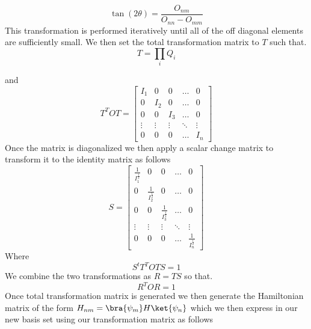   \begin{equation}
      \tan(2\theta)=\frac{O_{nm}}{O_{nn}-O_{mm}}
  \end{equation}
  This transformation is performed iteratively until all of the off diagonal elements are sufficiently small. We then set the total transformation matrix to \(T\) such that.
  \begin{equation}
      T=\prod_{i} Q_{i}
  \end{equation}

and
\begin{equation}
     T^{T}OT=\begin{bmatrix}
     I_{1}       & 0      & 0      &\hdots   & 0     \\
     0           & I_{2}  & 0      &\hdots   & 0     \\
     0           & 0      & I_{3}  &\hdots   & 0     \\  
    \vdots       & \vdots &\vdots  &\ddots   &\vdots \\  
     0           & 0      & 0      &\hdots   & I_{n} 
    \end{bmatrix}
 \end{equation}
Once the matrix is diagonalized we then apply a scalar change matrix to transform it to the identity matrix as follows
\begin{equation}
    S=\begin{bmatrix}
     \frac{1}{I_{1}^{\frac{1}{2}}}       & 0      & 0      &\hdots   & 0     \\
     0            &  \frac{1}{I_{2}^{\frac{1}{2}}}  & 0      &\hdots   & 0     \\
     0            & 0      &  \frac{1}{I_{3}^{\frac{1}{2}}}  &\hdots   & 0     \\  
     \vdots       & \vdots & \vdots  & \ddots  & \vdots \\  
     0            & 0      & 0       &\hdots   & \frac{1}{I_{n}^{\frac{1}{2}}} 
    
    
    \end{bmatrix}
\end{equation}
Where
\begin{equation}
    S^{t}T^{T}OTS=1
\end{equation}
We combine the two transformations as \(R=TS\) so that.
\begin{equation}
    R^{T}OR=1
\end{equation}
Once total transformation matrix is generated we then generate the Hamiltonian matrix of the form \(H_{nm}=\bra{\psi_{m}}H\ket{\psi_{n}}\) which we then express in our new basis set using our transformation matrix as follows
